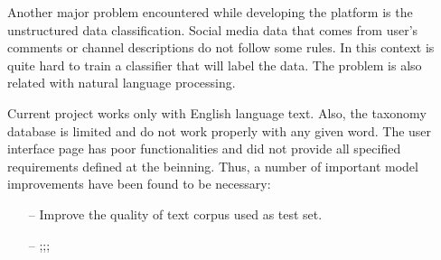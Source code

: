 Another major problem encountered while developing the platform is the unstructured data classification. Social media data that comes from user's comments or channel descriptions do not follow some rules. In this context is quite hard to train a classifier that will label the data. The problem is also related with natural language processing. 


\newpage

Current project works only with English language text. Also, the taxonomy database is limited and do not work properly with any given word. The user interface page has poor functionalities and did not provide all specified requirements defined at the beinning.
Thus, a number of important model improvements have been found to be necessary:

\begin{itemize}
\item[--] Improve the quality of text corpus used as test set.

\item[--] ;;;
\end{itemize}



\clearpage